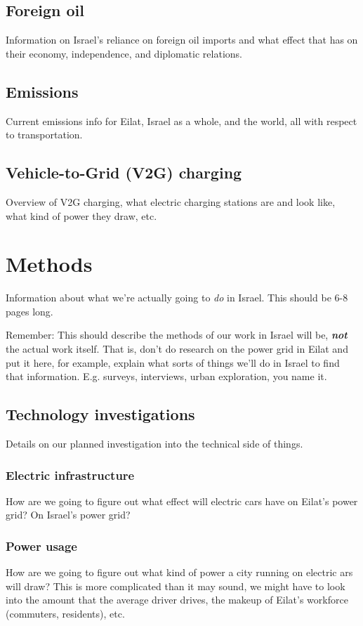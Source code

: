 \documentclass{article}
\begin{document}
\subsection{Foreign oil}
Information on Israel's reliance on foreign oil imports and what effect that has on their economy, independence, and diplomatic relations.

\subsection{Emissions}
Current emissions info for Eilat, Israel as a whole, and the world, all with respect to transportation.

\subsection{Vehicle-to-Grid (V2G) charging}
Overview of V2G charging, what electric charging stations are and look like, what kind of power they draw, etc.

\newpage
\section{Methods}
Information about what we're actually going to \textit{do} in Israel. This should be 6-8 pages long.

Remember: This should describe the methods of our work in Israel will be, \textbf{\textit{not}} the actual work itself. That is, don't do research on the power grid in Eilat and put it here, for example, explain what sorts of things we'll do in Israel to find that information. E.g. surveys, interviews, urban exploration, you name it.

\subsection{Technology investigations}
Details on our planned investigation into the technical side of things. 

\subsubsection{Electric infrastructure}
How are we going to figure out what effect will electric cars have on Eilat's power grid? On Israel's power grid? 

\subsubsection{Power usage}
How are we going to figure out what kind of power a city running on electric ars will draw? This is more complicated than it may sound, we might have to look into the amount that the average driver drives, the makeup of Eilat's workforce (commuters, residents), etc.
\end{document}
